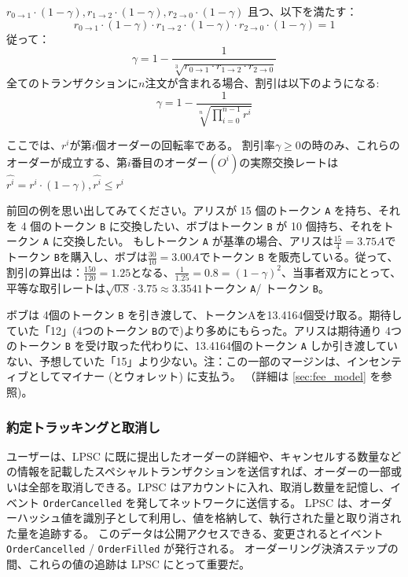 \documentclass{article}
\begin{document}
\begin{multicols}{2}
$r_{{0} \to {1}} \cdot (1- \gamma ), r_{{1} \to {2}} \cdot (1- \gamma ), r_{{2} \to {0}} \cdot (1- \gamma )$ 且つ、以下を満たす：
\begin{equation}
r_{{0} \to {1}} \cdot (1- \gamma ) \cdot r_{{1} \to {2}} \cdot (1- \gamma ) \cdot r_{{2} \to {0}} \cdot (1- \gamma ) =1
\end{equation}
従って：
\begin{equation}
\displaystyle \gamma =1- \frac{1}{ \sqrt[3]{r_{{0} \to {1}} \cdot r_{{1} \to {2}} \cdot r_{{2} \to {0}}}}
\end{equation}
全てのトランザクションに$n$注文が含まれる場合、割引は以下のようになる:
\begin{equation}
\displaystyle \gamma =1- \frac{1}{ \sqrt[n]{\prod_{i=0}^{n-1} r^i }}
\end{equation}

ここでは、$r^i$が第$i$個オーダーの回転率である。
割引率$ \gamma \geq 0$の時のみ、これらのオーダーが成立する、第$i$番目のオーダー$\left (O^i \right)$の実際交換レートは$\hat{r^i} =r^i \cdot \left(1 -\gamma \right),\hat{r^i} \leq r^i$

前回の例を思い出してみてください。アリスが 15 個のトークン \verb|A| を持ち、それを 4 個のトークン \verb|B| に交換したい、ボブはトークン \verb|B| が 10 個持ち、それをトークン \verb|A| に交換したい。
もしトークン \verb|A| が基準の場合、アリスは$\frac{15}{4} = 3.75A$でトークン \verb|B|を購入し、ボブは$\frac{30}{10} = 3.00A$でトークン \verb|B| を販売している。従って、割引の算出は：$\frac{150}{120} = 1.25$となる、$\frac{1}{1.25} = 0.8 =\left (1 −\gamma \right)^2$、当事者双方にとって、平等な取引レートは$\sqrt{0.8} \cdot 3.75 \approx 3.3541$トークン \verb|A|/ トークン \verb|B|。

ボブは 4個のトークン \verb|B| を引き渡して、トークンAを13.4164個受け取る。期待していた「12」(4つのトークン \verb|B|ので)より多めにもらった。アリスは期待通り 4つのトークン \verb|B| を受け取った代わりに、13.4164個のトークン \verb|A| しか引き渡していない、予想していた「15」より少ない。注：この一部のマージンは、インセンティブとしてマイナー (とウォレット) に支払う。
（詳細は \ref{sec:fee_model} を参照)。

\subsubsection{約定トラッキングと取消し}

ユーザーは、LPSC に既に提出したオーダーの詳細や、キャンセルする数量などの情報を記載したスペシャルトランザクションを送信すれば、オーダーの一部或いは全部を取消しできる。LPSC はアカウントに入れ、取消し数量を記憶し、イベント \verb|OrderCancelled| を発してネットワークに送信する。
LPSC は、オーダーハッシュ値を識別子として利用し、値を格納して、執行された量と取り消された量を追跡する。 このデータは公開アクセスできる、変更されるとイベント \verb|OrderCancelled| / \verb|OrderFilled| が発行される。 オーダーリング決済ステップの間、これらの値の追跡は LPSC にとって重要だ。


\end{multicols}
\end{document}
